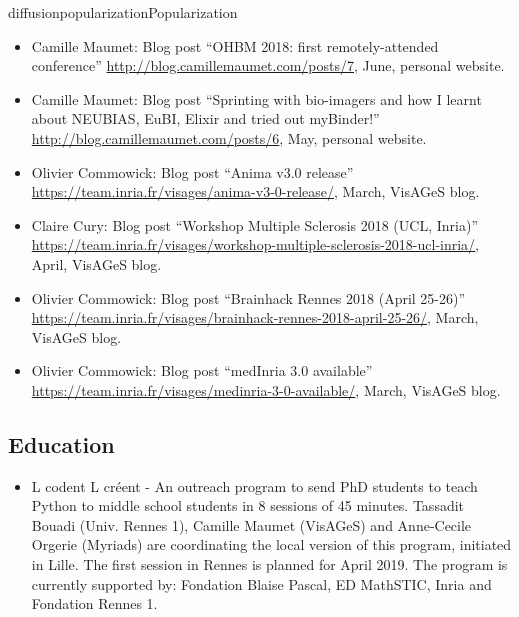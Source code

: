 \documentclass{ra2018}
\begin{document}
\begin{module}{diffusion}{popularization}{Popularization}
\begin{itemize}
   \item Camille Maumet: Blog post ``OHBM 2018: first remotely-attended conference'' \url{http://blog.camillemaumet.com/posts/7}, June, personal website.
   \item Camille Maumet: Blog post ``Sprinting with bio-imagers and how I learnt about NEUBIAS, EuBI, Elixir and tried out myBinder!'' \url{http://blog.camillemaumet.com/posts/6}, May, personal website. 
   \item Olivier Commowick: Blog post ``Anima v3.0 release'' \url{https://team.inria.fr/visages/anima-v3-0-release/}, March, VisAGeS blog.
   \item Claire Cury: Blog post ``Workshop Multiple Sclerosis 2018 (UCL, Inria)'' \url{https://team.inria.fr/visages/workshop-multiple-sclerosis-2018-ucl-inria/}, April, VisAGeS blog.
   \item Olivier Commowick: Blog post ``Brainhack Rennes 2018 (April 25-26)'' \url{https://team.inria.fr/visages/brainhack-rennes-2018-april-25-26/}, March, VisAGeS blog.
   \item Olivier Commowick: Blog post ``medInria 3.0 available'' \url{https://team.inria.fr/visages/medinria-3-0-available/}, March, VisAGeS blog.
 \end{itemize}

\subsection{Education}
\begin{itemize}
    \item L codent L créent - An outreach program to send PhD students to teach Python to middle school students in 8 sessions of 45 minutes. Tassadit Bouadi (Univ. Rennes 1), Camille Maumet (VisAGeS) and Anne-Cecile Orgerie (Myriads) are coordinating the local version of this program, initiated in Lille. The first session in Rennes is planned for April 2019. The program is currently supported by: Fondation Blaise Pascal, ED MathSTIC, Inria and Fondation Rennes 1.
\end{itemize}


\end{module}
\end{document}
